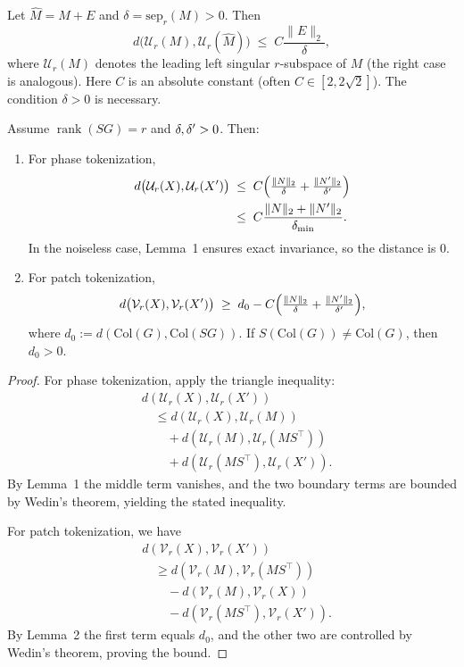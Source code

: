 \begin{lemma}
Let $\widehat M=M+E$ and $\delta=\mathrm{sep}_r(M)>0$. Then
\[
d\big(\mathcal U_r(M),\mathcal U_r(\widehat M)\big) \;\le\; C \frac{\|E\|_2}{\delta},
\]
where $\mathcal U_r(M)$ denotes the leading left singular $r$-subspace of $M$ (the right case is analogous). 
Here $C$ is an absolute constant (often $C\in[2,2\sqrt2]$). The condition $\delta>0$ is necessary.
\end{lemma}

\begin{theorem}
Assume $\operatorname{rank}(S G)=r$ and $\delta,\delta^{\prime}>0$. Then:

\begin{enumerate}
\item For phase tokenization,
\[
\begin{aligned}
d\big(\mathcal U_r(X), \mathcal U_r(X^{\prime})\big) &\;\le\;
C\Big(\tfrac{\|N\|_2}{\delta}+\tfrac{\|N^{\prime}\|_2}{\delta^{\prime}}\Big)\\
&\;\le\; C\frac{\|N\|_2+\|N^{\prime}\|_2}{\delta_{\min}}.
\end{aligned}
\]
In the noiseless case, Lemma~1 ensures exact invariance, so the distance is $0$.

\item For patch tokenization,
\[
\begin{aligned}
d\big(\mathcal V_r(X), \mathcal V_r(X^{\prime})\big) \;\ge\;
d_0 - C\Big(\tfrac{\|N\|_2}{\delta}+\tfrac{\|N^{\prime}\|_2}{\delta^{\prime}}\Big),
\end{aligned}
\]
where $d_0 := d(\mathrm{Col}(G),\mathrm{Col}(S G))$. If $S(\mathrm{Col}(G))\neq\mathrm{Col}(G)$, then $d_0>0$.
\end{enumerate}
\end{theorem}

\begin{proof}
For phase tokenization, apply the triangle inequality:
\[
\begin{aligned}
&d(\mathcal U_r(X),\mathcal U_r(X'))\\
&\quad\le d(\mathcal U_r(X),\mathcal U_r(M))\\
&\qquad + d(\mathcal U_r(M),\mathcal U_r(MS^\top))\\
&\qquad + d(\mathcal U_r(MS^\top),\mathcal U_r(X')).
\end{aligned}
\]
By Lemma~1 the middle term vanishes, and the two boundary terms are bounded by Wedin’s theorem, yielding the stated inequality.  

For patch tokenization, we have
\[
\begin{aligned}
&d(\mathcal V_r(X),\mathcal V_r(X'))\\
&\quad\ge d(\mathcal V_r(M),\mathcal V_r(MS^\top))\\
&\qquad - d(\mathcal V_r(M),\mathcal V_r(X))\\
&\qquad - d(\mathcal V_r(MS^\top),\mathcal V_r(X')).
\end{aligned}
\]
By Lemma~2 the first term equals $d_0$, and the other two are controlled by Wedin’s theorem, proving the bound.
\end{proof}

